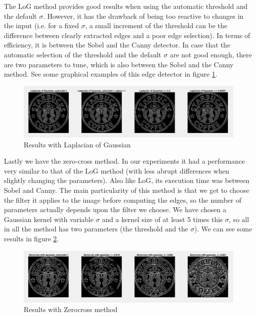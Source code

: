 The LoG method provides good results when using the automatic threshold and the default $\sigma$.
However, it has the drawback of being too reactive to changes in the input (i.e. for a fixed
$\sigma$, a small increment of the threshold can be the difference between clearly extracted edges
and a poor edge selection). In terms of efficiency, it is between the Sobel and the Canny detector.
In case that the automatic selection of the threshold and the default $\sigma$ are not good enough,
there are two parameters to tune, which is also between the Sobel and the Canny method. See some
graphical examples of this edge detector in figure \ref{fig:im4}.

\begin{figure}[!hbt]
  \includegraphics[width=\textwidth]{./img/ex1/im4.png}
  \caption{Results with Laplacian of Gaussian}
  \label{fig:im4}
\end{figure}

Lastly we have the zero-cross method. In our experiments it had a performance very similar to that of
the LoG method (with less abrupt differences when slightly changing the parameters). Also like LoG,
its execution time was between Sobel and Canny. The main particularity of this method is that
we get to choose the filter it applies to the image before computing the edges, so the number of
parameters actually depends upon the filter we choose. We have chosen a Gaussian kernel with
variable $\sigma$ and a kernel size of at least 5 times this $\sigma$, so all in all the method
has two parameters (the threshold and the $\sigma$). We can see some results in figure \ref{fig:im5}.

\begin{figure}[!hbt]
  \includegraphics[width=\textwidth]{./img/ex1/im5.png}
  \caption{Results with Zerocross method}
  \label{fig:im5}
\end{figure}

